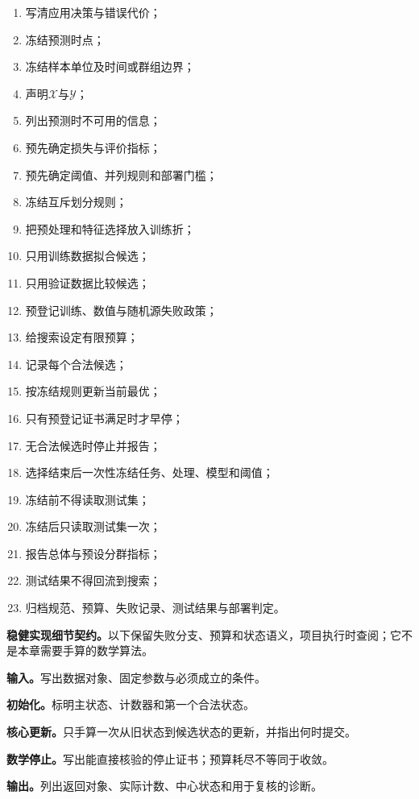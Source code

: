 \label{struct:V1-C11-CH10}
\label{struct:V1-C11-CH19}
\label{struct:V1-C11-CH20}
\label{struct:V1-C11-CH21}
\label{struct:V1-C11-CH22}
\label{struct:V1-C11-CH23}
\label{struct:V1-C11-CH24}
\label{struct:V1-C11-CH25}
\begin{keypointbox}[title=章末项目检查表（核心流程，不作为数学算法）]
\begin{enumerate}[leftmargin=2.2em,itemsep=1pt]
  \item 写清应用决策与错误代价；\item 冻结预测时点；
  \item 冻结样本单位及时间或群组边界；\item 声明$\mathcal X$与$\mathcal Y$；
  \item 列出预测时不可用的信息；\item 预先确定损失与评价指标；
  \item 预先确定阈值、并列规则和部署门槛；\item 冻结互斥划分规则；
  \item 把预处理和特征选择放入训练折；\item 只用训练数据拟合候选；
  \item 只用验证数据比较候选；\item 预登记训练、数值与随机源失败政策；
  \item 给搜索设定有限预算；\item 记录每个合法候选；
  \item 按冻结规则更新当前最优；\item 只有预登记证书满足时才早停；
  \item 无合法候选时停止并报告；\item 选择结束后一次性冻结任务、处理、模型和阈值；
  \item 冻结前不得读取测试集；\item 冻结后只读取测试集一次；
  \item 报告总体与预设分群指标；\item 测试结果不得回流到搜索；
  \item 归档规范、预算、失败记录、测试结果与部署判定。
\end{enumerate}
\end{keypointbox}

\textbf{稳健实现细节契约。}以下保留失败分支、预算和状态语义，项目执行时查阅；它不是本章需要手算的数学算法。
\begin{keypointbox}[title={算法执行契约：五步阅读}]
\textbf{输入。}写出数据对象、固定参数与必须成立的条件。\par
\textbf{初始化。}标明主状态、计数器和第一个合法状态。\par
\textbf{核心更新。}只手算一次从旧状态到候选状态的更新，并指出何时提交。\par
\textbf{数学停止。}写出能直接核验的停止证书；预算耗尽不等同于收敛。\par
\textbf{输出。}列出返回对象、实际计数、中心状态和用于复核的诊断。
\end{keypointbox}

